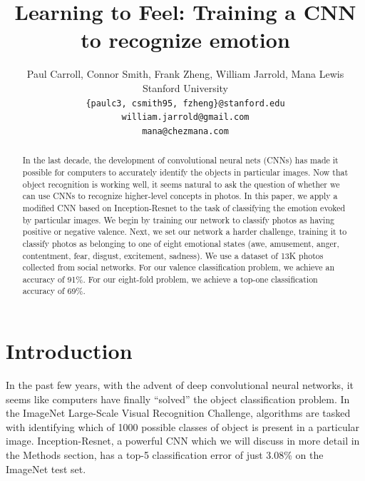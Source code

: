 \documentclass[10pt,twocolumn,letterpaper]{article}
\begin{document}
\title{Learning to Feel: Training a CNN to recognize emotion}

\author{Paul Carroll, Connor Smith, Frank Zheng, William Jarrold, Mana Lewis\footnotemark \\
Stanford University\\
{\tt\small \{paulc3, csmith95, fzheng\}@stanford.edu}\\
{\tt\small william.jarrold@gmail.com}\\
{\tt\small mana@chezmana.com}
}

\maketitle
{}

\begin{abstract}
In the last decade, the development of convolutional neural nets (CNNs) has made it possible for computers to accurately identify the objects in particular images. Now that object recognition is working well, it seems natural to ask the question of whether we can use CNNs to recognize higher-level concepts in photos. In this paper, we apply a modified CNN based on Inception-Resnet to the task of classifying the emotion evoked by particular images. We begin by training our network to classify photos as having positive or negative valence. Next, we set our network a harder challenge, training it to classify photos as belonging to one of eight emotional states (awe, amusement, anger, contentment, fear, disgust, excitement, sadness). We use a dataset of 13K photos collected from social networks. For our valence classification problem, we achieve an accuracy of 91\%. For our eight-fold problem, we achieve a top-one classification accuracy of 69\%.
\end{abstract}

\section{Introduction}
In the past few years, with the advent of deep convolutional neural networks, it seems like computers have finally ``solved'' the object classification problem. In the ImageNet Large-Scale Visual Recognition Challenge\cite{imagenet}, algorithms are tasked with identifying which of 1000 possible classes of object is present in a particular image.  Inception-Resnet, a powerful CNN which we will discuss in more detail in the Methods section, has a top-5 classification error of just 3.08\% on the ImageNet test set\cite{inceptionresnet}.
\end{document}
